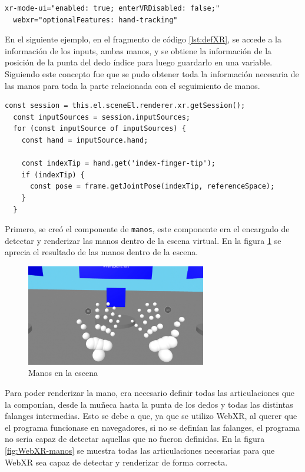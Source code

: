 \documentclass[a4paper, 12pt]{book}
\begin{document}
\begin{lstlisting}[caption=Definición de WebXR en la escena, captionpos=b, label=lst:webxr]
  xr-mode-ui="enabled: true; enterVRDisabled: false;" 
  webxr="optionalFeatures: hand-tracking"
\end{lstlisting}

En el siguiente ejemplo, en el fragmento de código \ref{lst:defXR}, se accede a la información de los inputs, ambas manos, y se obtiene la información de la posición de la punta del dedo índice para luego guardarlo en una variable. Siguiendo este concepto fue que se pudo obtener toda la información necesaria de las manos para toda la parte relacionada con el seguimiento de manos.

\begin{lstlisting}[caption=Ejemplo simplificado de acceder a la información XR, captionpos=b, label=lst:defXR]
  const session = this.el.sceneEl.renderer.xr.getSession();
  const inputSources = session.inputSources;
  for (const inputSource of inputSources) {
    const hand = inputSource.hand;
    
    const indexTip = hand.get('index-finger-tip');
    if (indexTip) {
      const pose = frame.getJointPose(indexTip, referenceSpace);
    }
  }
\end{lstlisting}


Primero, se creó el componente de \texttt{manos}, este componente era el encargado de detectar y renderizar las manos dentro de la escena virtual. En la figura \ref{fig:manos} se aprecia el resultado de las manos dentro de la escena.

\begin{figure}[H] 
  \centering
  \includegraphics[width=0.7\textwidth]{img/manos.jpg} 
  \caption{Manos en la escena}
  \label{fig:manos}
\end{figure}

Para poder renderizar la mano, era necesario definir todas las articulaciones que la componían, desde la muñeca hasta la punta de los dedos y todas las distintas falanges intermedias. Esto se debe a que, ya que se utilizo WebXR, al querer que el programa funcionase en navegadores, si no se definían las falanges, el programa no seria capaz de detectar aquellas que no fueron definidas.
En la figura \ref{fig:WebXR-manos} se muestra todas las articulaciones necesarias para que WebXR sea capaz de detectar y renderizar de forma correcta. 
\end{document}
